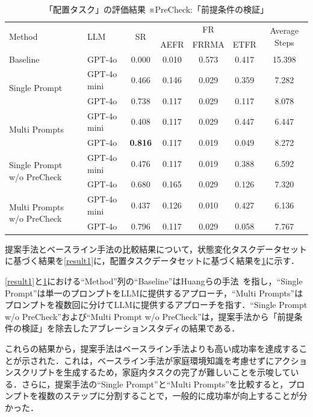 \begin{table}[tb]
    \caption{「配置タスク」の評価結果  ※PreCheck:「前提条件の検証」}
    \label{result2}
    \centering
    \begin{tabular}{llccccc}
    \hline
         \multirow{2}{*}{Method} & \multirow{2}{*}{LLM} & \multirow{2}{*}{SR} & \multicolumn{3}{c}{FR} & \multirow{2}{*}{Average Steps}\\
          & & & AEFR & FRRMA & ETFR\\
    \hline
         Baseline~\cite{huang22} & GPT-4o & 0.000 & 0.010 & 0.573 & 0.417 & 15.398\\
    \hline    
         \multirow{2}{*}{Single Prompt} & GPT-4o mini & 0.466 & 0.146 & 0.029 & 0.359 & 7.282\\
         & GPT-4o & 0.738 & 0.117 & 0.029 & 0.117 & 8.078\\
         
         \multirow{2}{*}{Multi Prompts} & GPT-4o mini & 0.408 & 0.117 & 0.029 & 0.447 & 6.447\\
         & GPT-4o & \textbf{0.816} & 0.117 & 0.019 & 0.049 & 8.272\\
    \hline
        \multirow{2}{*}{Single Prompt w/o PreCheck} & GPT-4o mini & 0.476 & 0.117 & 0.019 & 0.388 & 6.592\\
         & GPT-4o & 0.680 & 0.165 & 0.029 & 0.126 & 7.320\\
         
         \multirow{2}{*}{Multi Prompts w/o PreCheck} & GPT-4o mini & 0.437 & 0.126 & 0.010 & 0.427 & 6.136\\
         & GPT-4o & 0.796 & 0.117 & 0.029 & 0.058 & 7.767\\
    \hline
    \end{tabular}
\end{table}

提案手法とベースライン手法の比較結果について，状態変化タスクデータセットに基づく結果を\ref{result1}に，配置タスクデータセットに基づく結果を\ref{result2}に示す．

\ref{result1}と\ref{result2}における``Method''列の``Baseline''はHuangらの手法~\cite{huang22}を指し，``Single Prompt''は単一のプロンプトをLLMに提供するアプローチ，``Multi Prompts''はプロンプトを複数回に分けてLLMに提供するアプローチを指す．``Single Prompt w/o PreCheck''および``Multi Prompt w/o PreCheck''は，提案手法から「前提条件の検証」を除去したアブレーションスタディの結果である．

これらの結果から，提案手法はベースライン手法よりも高い成功率を達成することが示された．これは，ベースライン手法が家庭環境知識を考慮せずにアクションスクリプトを生成するため，家庭内タスクの完了が難しいことを示唆している．さらに，提案手法の``Single Prompt''と``Multi Prompts''を比較すると，プロンプトを複数のステップに分割することで，一般的に成功率が向上することが分かった．

